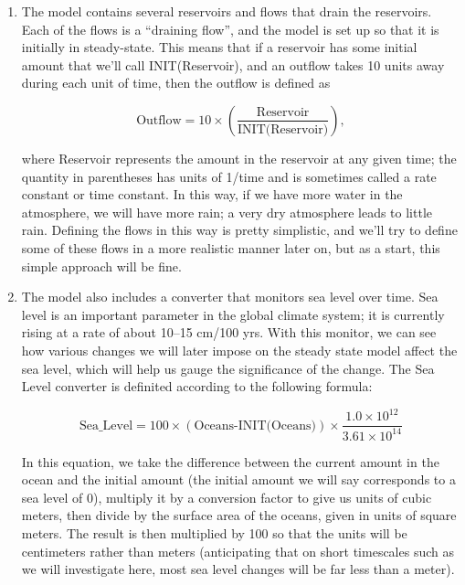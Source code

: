\documentclass[11pt,letterpaper]{article}
\begin{document}
\begin{enumerate}
\item The model contains several reservoirs and flows that drain the reservoirs. Each of the flows is a ``draining flow'', and the model is set up so that it is initially in steady-state. This means that if a reservoir has some initial amount that we'll call INIT(Reservoir), and an outflow takes 10 units away during each unit of time, then the outflow is defined as

$$\mbox{Outflow}=10\times\left(\frac{\mbox{Reservoir}}{\mbox{INIT(Reservoir)}}\right),$$

where Reservoir represents the amount in the reservoir at any given time; the quantity in parentheses has units of 1/time and is sometimes called a rate constant or time constant. In this way, if we have more water in the atmosphere, we will have more rain; a very dry atmosphere leads to little rain. Defining the flows in this way is pretty simplistic, and we'll try to define some of these flows in a more realistic manner later on, but as a start, this simple approach will be fine. 


\item The model also includes a converter that monitors sea level over time. Sea level is an important parameter in the global climate system; it is currently rising at a rate of about 10--15 cm/100 yrs. With this monitor, we can see how various changes we will later impose on the steady state model affect the sea level, which will help us gauge the significance of the change. The Sea Level converter is definited according to the following formula:

$$\mbox{Sea\_Level} = 100\times(\mbox{Oceans-INIT(Oceans)})\times \frac{1.0\times 10^{12}}{3.61\times 10^{14}}$$

In this equation, we take the difference between the current amount in the ocean and the initial amount (the initial amount we will say corresponds to a sea level of 0), multiply it by a conversion factor to give us units of cubic meters, then divide by the surface area of the oceans, given in units of square meters. The result is then multiplied by 100 so that the units will be centimeters rather than meters (anticipating that on short timescales such as we will investigate here, most sea level changes will be far less than a meter).

\end{enumerate}
\end{document}
